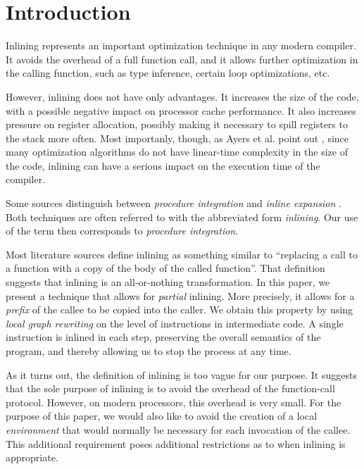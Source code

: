 \section{Introduction}

Inlining represents an important optimization technique in any modern
compiler.  It avoids the overhead of a full function call, and it
allows further optimization in the calling function, such as type
inference, certain loop optimizations, etc.

However, inlining does not have only advantages.  It increases the
size of the code, with a possible negative impact on processor cache
performance.  It also increases pressure on register allocation,
possibly making it necessary to spill registers to the stack more
often.  Most importanly, though, as Ayers et al. point out
\cite{Ayers:1997:AI:258915.258928, Ayers:1997:AI:258916.258928}, since
many optimization algorithms do not have linear-time complexity in the
size of the code, inlining can have a serious impact on the execution
time of the compiler.

Some sources distinguish between \emph{procedure integration} and
\emph{inline expansion} \cite{Muchnick:1998:ACD:286076}.  Both
techniques are often referred to with the abbreviated form
\emph{inlining}.  Our use of the term then corresponds to
\emph{procedure integration}.

Most literature sources define inlining as something similar to
``replacing a call to a function with a copy of the body of the called
function''.  That definition suggests that inlining is an
all-or-nothing transformation.  In this paper, we present a technique
that allows for \emph{partial} inlining.  More precisely, it allows
for a \emph{prefix} of the callee to be copied into the caller.  We
obtain this property by using \emph{local graph rewriting} on the
level of instructions in intermediate code.  A single instruction is
inlined in each step, preserving the overall semantics of the program,
and thereby allowing us to stop the process at any time.

As it turns out, the definition of inlining is too vague for our
purpose.  It suggests that the sole purpose of inlining is to avoid
the overhead of the function-call protocol.  However, on modern
processors, this overhead is very small.  For the purpose of this
paper, we would also like to avoid the creation of a local
\emph{environment} that would normally be necessary for each
invocation of the callee.  This additional requirement poses
additional restrictions as to when inlining is appropriate.

